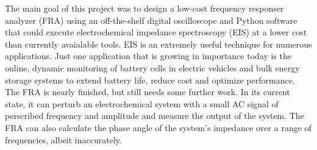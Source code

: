 
The main goal of this project was to design a low-cost frequency responser analyzer (FRA) using an off-the-shelf digital oscilloscope and Python software that could execute electrochemical impedance spectroscopy (EIS) at a lower cost than currently avaialable tools. EIS is an extremely useful technique for numerous applications. Just one application that is growing in importance today is the online, dynamic monitoring of battery cells in electric vehicles and bulk energy storage systems to extend battery life, reduce cost and optimize performance. The FRA is nearly finished, but still needs some further work. In its current state, it can perturb an electrochemical system with a small AC signal of perscribed frequency and amplitude and measure the output of the system. The FRA can also calculate the phase angle of the system's impedance over a range of frequencies, albeit inaccurately.

